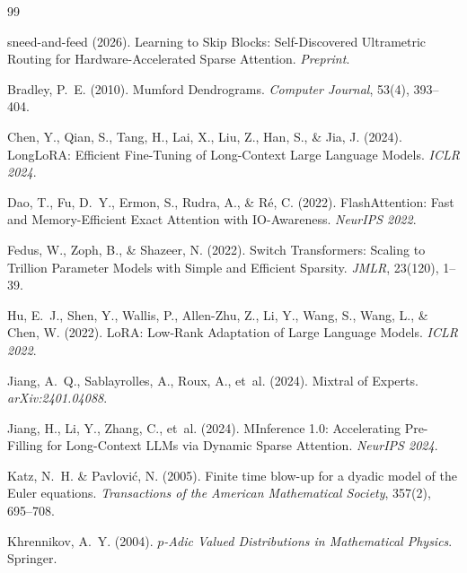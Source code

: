\documentclass[11pt,a4paper]{article}
\begin{document}
\begin{thebibliography}{99}

sneed-and-feed (2026).
\newblock Learning to Skip Blocks: Self-Discovered Ultrametric Routing for Hardware-Accelerated Sparse Attention.
\newblock \emph{Preprint}.

Bradley, P.~E. (2010).
\newblock Mumford Dendrograms.
\newblock \emph{Computer Journal}, 53(4), 393--404.

Chen, Y., Qian, S., Tang, H., Lai, X., Liu, Z., Han, S., \& Jia, J. (2024).
\newblock LongLoRA: Efficient Fine-Tuning of Long-Context Large Language Models.
\newblock \emph{ICLR 2024}.

Dao, T., Fu, D.~Y., Ermon, S., Rudra, A., \& R\'{e}, C. (2022).
\newblock FlashAttention: Fast and Memory-Efficient Exact Attention with IO-Awareness.
\newblock \emph{NeurIPS 2022}.

Fedus, W., Zoph, B., \& Shazeer, N. (2022).
\newblock Switch Transformers: Scaling to Trillion Parameter Models with Simple and Efficient Sparsity.
\newblock \emph{JMLR}, 23(120), 1--39.

Hu, E.~J., Shen, Y., Wallis, P., Allen-Zhu, Z., Li, Y., Wang, S., Wang, L., \& Chen, W. (2022).
\newblock LoRA: Low-Rank Adaptation of Large Language Models.
\newblock \emph{ICLR 2022}.

Jiang, A.~Q., Sablayrolles, A., Roux, A., et~al. (2024).
\newblock Mixtral of Experts.
\newblock \emph{arXiv:2401.04088}.

Jiang, H., Li, Y., Zhang, C., et~al. (2024).
\newblock MInference 1.0: Accelerating Pre-Filling for Long-Context LLMs via Dynamic Sparse Attention.
\newblock \emph{NeurIPS 2024}.

Katz, N.~H. \& Pavlovi\'c, N. (2005).
\newblock Finite time blow-up for a dyadic model of the Euler equations.
\newblock \emph{Transactions of the American Mathematical Society}, 357(2), 695--708.

Khrennikov, A.~Y. (2004).
\newblock \emph{$p$-Adic Valued Distributions in Mathematical Physics}.
\newblock Springer.


\end{thebibliography}
\end{document}
